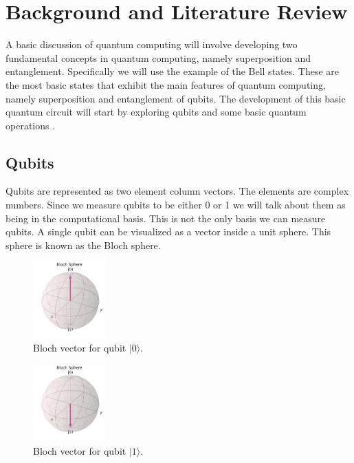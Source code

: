 \documentclass[conference]{IEEEtran}
\newcommand{\ket}[1]{{\lvert #1 \rangle}}
\begin{document}
\section{Background and Literature Review}

A basic discussion of quantum computing will involve developing two fundamental concepts in quantum computing, namely superposition and entanglement.
Specifically we will use the example of the Bell states. These are the most basic states that exhibit the main features of quantum computing, namely superposition and entanglement of qubits. The development of this basic quantum circuit will start by exploring qubits and some basic quantum operations \cite{b1, b2}.  

\subsection{Qubits}

Qubits are represented as two element column vectors. The elements are complex numbers. Since we measure qubits to be either 0 or 1 we will talk about them as being in the computational basis. This is not the only basis we can measure qubits. A single qubit can be visualized as a vector inside a unit sphere. This sphere is known as the Bloch sphere. 

\begin{figure}[H]
    \centering
    \includegraphics[width=0.25\textwidth]{bloch0.png}
    \caption{Bloch vector for qubit $\ket{0}$.}
    \label{fig:bloch0}
\end{figure}

\begin{figure}[H]
    \centering
    \includegraphics[width=0.25\textwidth]{bloch1.png}
    \caption{Bloch vector for qubit $\ket{1}$.}
    \label{fig:bloch1}
\end{figure}
\end{document}

